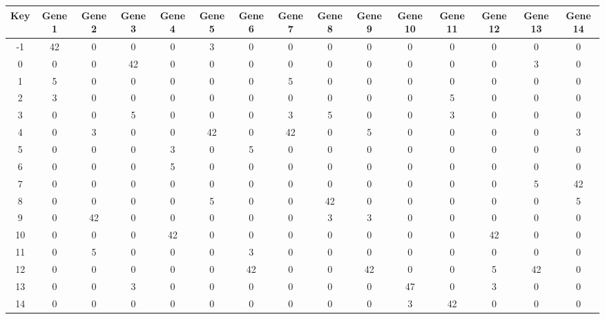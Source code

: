 \begin{tabular}{|c|c|c|c|c|c|c|c|c|c|c|c|c|c|c|}
\hline
Key & Gene 1 & Gene 2 & Gene 3 & Gene 4 & Gene 5 & Gene 6 & Gene 7 & Gene 8 & Gene 9 & Gene 10 & Gene 11 & Gene 12 & Gene 13 & Gene 14 \\
\hline
-1 & 42 & 0 & 0 & 0 & 3 & 0 & 0 & 0 & 0 & 0 & 0 & 0 & 0 & 0 \\
0 & 0 & 0 & 42 & 0 & 0 & 0 & 0 & 0 & 0 & 0 & 0 & 0 & 3 & 0 \\
1 & 5 & 0 & 0 & 0 & 0 & 0 & 5 & 0 & 0 & 0 & 0 & 0 & 0 & 0 \\
2 & 3 & 0 & 0 & 0 & 0 & 0 & 0 & 0 & 0 & 0 & 5 & 0 & 0 & 0 \\
3 & 0 & 0 & 5 & 0 & 0 & 0 & 3 & 5 & 0 & 0 & 3 & 0 & 0 & 0 \\
4 & 0 & 3 & 0 & 0 & 42 & 0 & 42 & 0 & 5 & 0 & 0 & 0 & 0 & 3 \\
5 & 0 & 0 & 0 & 3 & 0 & 5 & 0 & 0 & 0 & 0 & 0 & 0 & 0 & 0 \\
6 & 0 & 0 & 0 & 5 & 0 & 0 & 0 & 0 & 0 & 0 & 0 & 0 & 0 & 0 \\
7 & 0 & 0 & 0 & 0 & 0 & 0 & 0 & 0 & 0 & 0 & 0 & 0 & 5 & 42 \\
8 & 0 & 0 & 0 & 0 & 5 & 0 & 0 & 42 & 0 & 0 & 0 & 0 & 0 & 5 \\
9 & 0 & 42 & 0 & 0 & 0 & 0 & 0 & 3 & 3 & 0 & 0 & 0 & 0 & 0 \\
10 & 0 & 0 & 0 & 42 & 0 & 0 & 0 & 0 & 0 & 0 & 0 & 42 & 0 & 0 \\
11 & 0 & 5 & 0 & 0 & 0 & 3 & 0 & 0 & 0 & 0 & 0 & 0 & 0 & 0 \\
12 & 0 & 0 & 0 & 0 & 0 & 42 & 0 & 0 & 42 & 0 & 0 & 5 & 42 & 0 \\
13 & 0 & 0 & 3 & 0 & 0 & 0 & 0 & 0 & 0 & 47 & 0 & 3 & 0 & 0 \\
14 & 0 & 0 & 0 & 0 & 0 & 0 & 0 & 0 & 0 & 3 & 42 & 0 & 0 & 0 \\
\hline
\end{tabular}